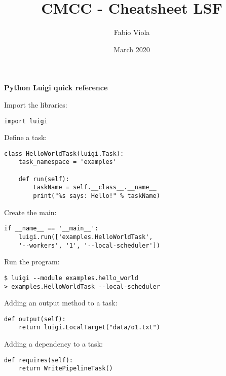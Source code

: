 \documentclass[twocolumn,8pt]{article}
\title{CMCC - Cheatsheet LSF}
\author{Fabio Viola}
\date{March 2020}
\begin{document}

\LARGE \textbf{Python Luigi quick reference} \normalsize

\begin{mdframed}[frametitle=basics]
Import the libraries:
\begin{lstlisting}
import luigi
\end{lstlisting}
\end{mdframed}

\begin{mdframed}[frametitle=Single task program]
Define a task:
\begin{lstlisting}
class HelloWorldTask(luigi.Task):
    task_namespace = 'examples'

    def run(self):
        taskName = self.__class__.__name__
        print("%s says: Hello!" % taskName)

\end{lstlisting}

Create the main:
\begin{lstlisting}
if __name__ == '__main__':
    luigi.run(['examples.HelloWorldTask',
    '--workers', '1', '--local-scheduler'])
\end{lstlisting}

Run the program:
\begin{lstlisting}
$ luigi --module examples.hello_world
> examples.HelloWorldTask --local-scheduler
\end{lstlisting}
\end{mdframed}

\begin{mdframed}[frametitle=Output of a task]
Adding an output method to a task:
\begin{lstlisting}
def output(self):
    return luigi.LocalTarget("data/o1.txt")
\end{lstlisting}
\end{mdframed}

\begin{mdframed}[frametitle=Specifying dependencies]
Adding a dependency to a task:
\begin{lstlisting}
def requires(self):
    return WritePipelineTask()
\end{lstlisting}
\end{mdframed}
\end{document}
